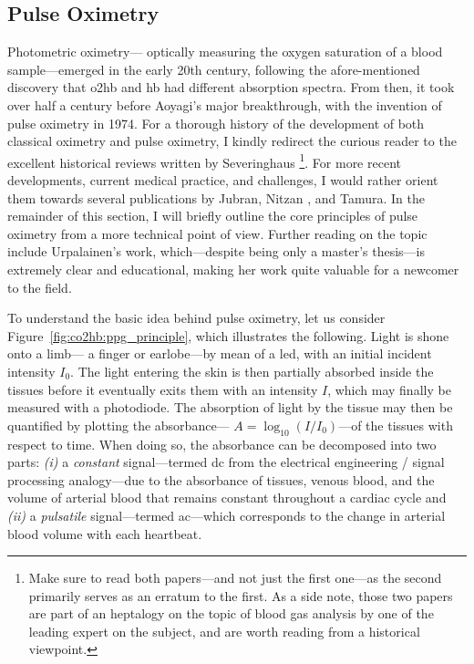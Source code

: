 \subsection{Pulse Oximetry}\label{sect:co2hb:pulse_oximetry}

Photometric oximetry---\ie{} optically measuring the oxygen saturation of a blood sample---emerged in the early 20th century, following the afore-mentioned discovery that \gls{o2hb} and \gls{hb} had different absorption spectra. From then, it took over half a century before Aoyagi's major breakthrough, with the invention of pulse oximetry in 1974\cite{miyasaka2021}. For a thorough history of the development of both classical oximetry and pulse oximetry, I kindly redirect the curious reader to the excellent historical reviews written by Severinghaus \etal{}\cite{severinghaus1986_6, severinghaus1987_vii}\footnote{Make sure to read both papers---and not just the first one---as the second primarily serves as an erratum to the first. As a side note, those two papers are part of an heptalogy on the topic of blood gas analysis by one of the leading expert on the subject, and are worth reading from a historical viewpoint.}. For more recent developments, current medical practice, and challenges, I would rather orient them towards several publications by Jubran\cite{jubran2015}, Nitzan \etal\cite{nitzan2014}, and Tamura\cite{tamura2019}. In the remainder of this section, I will briefly outline the core principles of pulse oximetry from a more technical point of view. Further reading on the topic include Urpalainen's work, which---despite being only a master's thesis---is extremely clear and educational, making her work quite valuable for a newcomer to the field\cite[Chap.~2]{katja2011}.

To understand the basic idea behind pulse oximetry, let us consider Figure~\ref{fig:co2hb:ppg_principle}, which illustrates the following. Light is shone onto a limb---\eg{} a finger or earlobe---by mean of a \gls{led}, with an initial incident intensity $I_0$. The light entering the skin is then partially absorbed inside the tissues before it eventually exits them with an intensity $I$, which may finally be measured with a photodiode. The absorption of light by the tissue may then be quantified by plotting the absorbance---\ie{} $A=\log_{10}(I/I_0)$---of the tissues with respect to time. When doing so, the absorbance can be decomposed into two parts: \textit{(i)} a \emph{constant} signal---termed \gls{dc} from the electrical engineering / signal processing analogy---due to the absorbance of tissues, venous blood, and the volume of arterial blood that remains constant throughout a cardiac cycle and \textit{(ii)} a \emph{pulsatile} signal---termed \gls{ac}---which corresponds to the change in arterial blood volume with each heartbeat.

